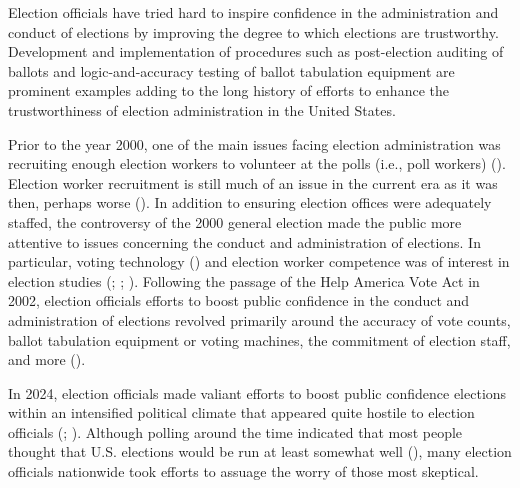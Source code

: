 \documentclass[
  12pt,
  letterpaper,
]{article}
\begin{document}
Election officials have tried hard to inspire confidence in the
administration and conduct of elections by improving the degree to which
elections are trustworthy. Development and implementation of procedures
such as post-election auditing of ballots and logic-and-accuracy testing
of ballot tabulation equipment are prominent examples adding to the long
history of efforts to enhance the trustworthiness of election
administration in the United States.

Prior to the year 2000, one of the main issues facing election
administration was recruiting enough election workers to volunteer at
the polls (i.e., poll workers) (). Election worker recruitment is still much of an issue in the
current era as it was then, perhaps worse
(). In
addition to ensuring election offices were adequately staffed, the
controversy of the 2000 general election made the public more attentive
to issues concerning the conduct and administration of elections. In
particular, voting technology () and election worker competence was of interest
in election studies (;
;
).
Following the passage of the Help America Vote Act in 2002, election
officials efforts to boost public confidence in the conduct and
administration of elections revolved primarily around the accuracy of
vote counts, ballot tabulation equipment or voting machines, the
commitment of election staff, and more
().

In 2024, election officials made valiant efforts to boost public
confidence elections within an intensified political climate that
appeared quite hostile to election officials
(; ). Although
polling around the time indicated that most people thought that U.S.
elections would be run at least somewhat well
(), many election officials
nationwide took efforts to assuage the worry of those most skeptical.
\end{document}
